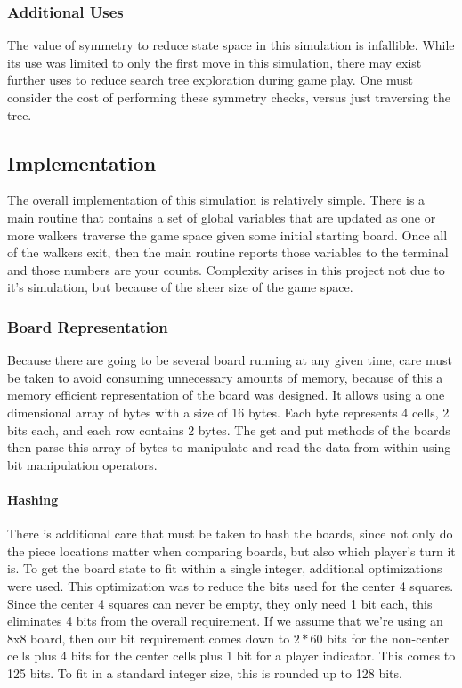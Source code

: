 \documentclass{article}
\begin{document}
\subsubsection{Additional Uses}

The value of symmetry to reduce state space in this simulation is infallible. While its use was limited to only the first move in this simulation, there may exist further uses to reduce search tree exploration during game play. One must consider the cost of performing these symmetry checks, versus just traversing the tree.

\newpage

\subsection{Implementation}

The overall implementation of this simulation is relatively simple. There is a main routine that contains a set of global variables that are updated as one or more walkers traverse the game space given some initial starting board. Once all of the walkers exit, then the main routine reports those variables to the terminal and those numbers are your counts. Complexity arises in this project not due to it's simulation, but because of the sheer size of the game space.

\subsubsection{Board Representation}

Because there are going to be several board running at any given time, care must be taken to avoid consuming unnecessary amounts of memory, because of this a memory efficient representation of the board was designed. It allows using a one dimensional array of bytes with a size of 16 bytes. Each byte represents 4 cells, 2 bits each, and each row contains 2 bytes. The get and put methods of the boards then parse this array of bytes to manipulate and read the data from within using bit manipulation operators.

\paragraph{Hashing}

There is additional care that must be taken to hash the boards, since not only do the piece locations matter when comparing boards, but also which player's turn it is. To get the board state to fit within a single integer, additional optimizations were used. This optimization was to reduce the bits used for the center 4 squares. Since the center 4 squares can never be empty, they only need 1 bit each, this eliminates 4 bits from the overall requirement. If we assume that we're using an 8x8 board, then our bit requirement comes down to $2*60$ bits for the non-center cells plus 4 bits for the center cells plus 1 bit for a player indicator. This comes to 125 bits. To fit in a standard integer size, this is rounded up to 128 bits.
\end{document}
